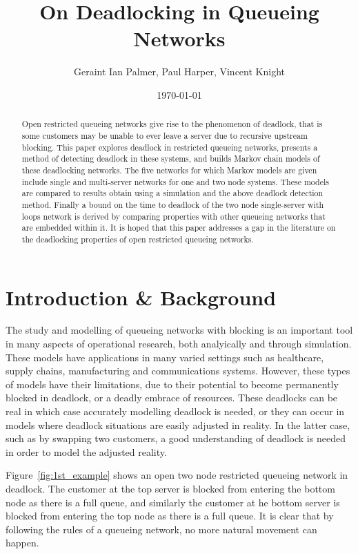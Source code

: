 \documentclass{article}
\title{On Deadlocking in Queueing Networks}
\author{Geraint Ian Palmer, Paul Harper, Vincent Knight}
\date{\today}
\begin{document}
\onehalfspacing

\maketitle

\begin{abstract}
Open restricted queueing networks give rise to the phenomenon of deadlock, that is some customers may be unable to ever leave a server due to recursive upstream blocking.
This paper explores deadlock in restricted queueing networks, presents a method of detecting deadlock in these systems, and builds Markov chain models of these deadlocking networks.
The five networks for which Markov models are given include single and multi-server networks for one and two node systems.
These models are compared to results obtain using a simulation and the above deadlock detection method.
Finally a bound on the time to deadlock of the two node single-server with loops network is derived by comparing properties with other queueing networks that are embedded within it.
It is hoped that this paper addresses a gap in the literature on the deadlocking properties of open restricted queueing networks.

\end{abstract}

\section{Introduction \& Background}

The study and modelling of queueing networks with blocking is an important tool in many aspects of operational research, both analyically and through simulation.
These models have applications in many varied settings such as healthcare, supply chains, manufacturing and communications systems.
However, these types of models have their limitations, due to their potential to become permanently blocked in deadlock, or a deadly embrace of resources.
These deadlocks can be real in which case accurately modelling deadlock is needed, or they can occur in models where deadlock situations are easily adjusted in reality. In the latter case, such as by swapping two customers, a good understanding of deadlock is needed in order to model the adjusted reality.

Figure~\ref{fig:1st_example} shows an open two node restricted queueing network in deadlock.
The customer at the top server is blocked from entering the bottom node as there is a full queue, and similarly the customer at he bottom server is blocked from entering the top node as there is a full queue.
It is clear that by following the rules of a queueing network, no more natural movement can happen.
\end{document}
